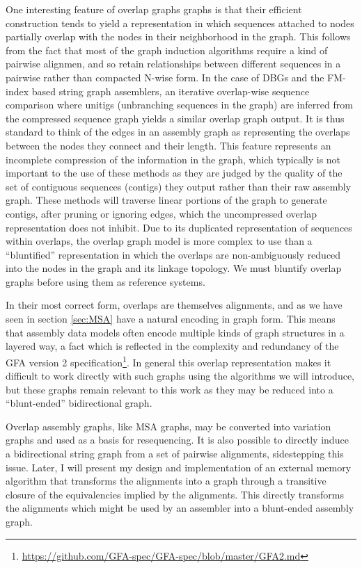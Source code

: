 One interesting feature of overlap graphs graphs is that their efficient construction tends to yield a representation in which sequences attached to nodes partially overlap with the nodes in their neighborhood in the graph.
This follows from the fact that most of the graph induction algorithms require a kind of pairwise alignmen, and so retain relationships between different sequences in a pairwise rather than compacted N-wise form.
In the case of DBGs and the FM-index based string graph assemblers, an iterative overlap-wise sequence comparison where unitigs (unbranching sequences in the graph) are inferred from the compressed sequence graph yields a similar overlap graph output.
It is thus standard to think of the edges in an assembly graph as representing the overlaps between the nodes they connect and their length.
This feature represents an incomplete compression of the information in the graph, which typically is not important to the use of these methods as they are judged by the quality of the set of contiguous sequences (contigs) they output rather than their raw assembly graph.
These methods will traverse linear portions of the graph to generate contigs, after pruning or ignoring edges, which the uncompressed overlap representation does not inhibit.
Due to its duplicated representation of sequences within overlaps, the overlap graph model is more complex to use than a ``bluntified'' representation in which the overlaps are non-ambiguously reduced into the nodes in the graph and its linkage topology.
We must bluntify overlap graphs before using them as reference systems.

In their most correct form, overlaps are themselves alignments, and as we have seen in section \ref{sec:MSA} have a natural encoding in graph form.
This means that assembly data models often encode multiple kinds of graph structures in a layered way, a fact which is reflected in the complexity and redundancy of the GFA version 2 specification\footnote{\url{https://github.com/GFA-spec/GFA-spec/blob/master/GFA2.md}}.
In general this overlap representation makes it difficult to work directly with such graphs using the algorithms we will introduce, but these graphs remain relevant to this work as they may be reduced into a ``blunt-ended'' bidirectional graph.


Overlap assembly graphs, like MSA graphs, may be converted into variation graphs and used as a basis for resequencing.
It is also possible to directly induce a bidirectional string graph from a set of pairwise alignments, sidestepping this issue.
Later, I will present my design and implementation of an external memory algorithm that transforms the alignments into a graph through a transitive closure of the equivalencies implied by the alignments.
This directly transforms the alignments which might be used by an assembler into a blunt-ended assembly graph.

